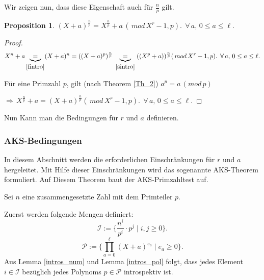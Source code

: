 \documentclass[12pt,oneside]{article}
\newtheorem{prop}{Proposition}[section]
\theoremstyle{remark}
\theoremstyle{definition}
\begin{document}
\begin{flushleft}
Wir zeigen nun, dass diese Eigenschaft auch für $\frac{n}{p}$ gilt.\newline

\begin{prop}
$(X + a)^{\frac{n}{p}} = X^{\frac{n}{p}} + a \, (\, mod \, X^r -1,p). \; \, \forall\,a, \,  0 \leq a \leq \ell.$
\end{prop}

\begin{proof}
\begin{align*}
    X^{n} + a \underbrace{=}_{\ref{fintro}} (X + a)^n = ((X + a)^{p})^{\frac{n}{p}} \; \underbrace{=}_{\ref{sintro}} \; ((X^{p} + a))^{\frac{n}{p}} (\, mod \, X^r - 1,p). \; \, \forall\,a, \, 0 \leq a \leq \ell.
\end{align*}

Für eine Primzahl $p$, gilt (nach Theorem \ref{Th_2}) $a^p = a \, (mod \, p)$

$\Rightarrow \, X^{\frac{n}{p}} + a = (X + a)^{\frac{n}{p}} (\, mod \, X^r - 1,p). \; \, \forall\,a, \, 0 \leq a \leq \ell.$
\end{proof}

Nun Kann man die Bedingungen für $r$ und $a$ definieren. 

\subsubsection{AKS-Bedingungen}
In diesem Abschnitt werden die erforderlichen Einschränkungen für $r$ und $a$ hergeleitet. Mit Hilfe dieser Einschränkungen wird das sogenannte AKS-Theorem formuliert. Auf Diesem Theorem baut der AKS-Primzahltest auf.

Sei $n$ eine zusammengesetzte Zahl mit dem Primteiler $p$. 

Zuerst werden folgende Mengen definiert:\newline\newline
\begin{equation}\label{I_Set}
      \mathcal{I} := \{ \frac{n^i}{p^i} \cdot p^j \mid i,j \geq 0\}.
\end{equation}
\begin{equation}
     \mathcal{P} := \{ \prod_{a = 0}^{\ell} (X + a)^{e_{a}} \mid e_{a} \geq 0 \}.
\end{equation}\label{P_Set}
\newline\newline
Aus Lemma \ref{intros_num} und Lemma \ref{intros_pol} folgt, dass jedes Element $i \in \mathcal{I}$ bezüglich jedes Polynoms $p \in \mathcal{P}$ introspektiv ist.\newline\newline


\end{flushleft}
\end{document}
